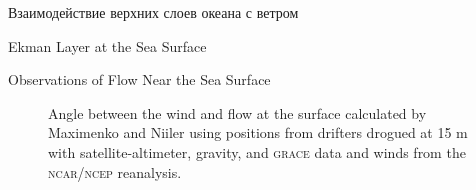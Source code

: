 \begin{chapter}{Взаимодействие верхних слоев океана с ветром}
\begin{section}{Ekman Layer at the Sea Surface}
\begin{paragraph}{Observations of Flow Near the Sea Surface}
\begin{figure}[t!]
\caption{Angle between the wind and flow at the surface calculated by
Maximenko and Niiler using positions from drifters drogued at 15 m
with satellite-altimeter, gravity, and \textsc{grace}
data and winds from the \textsc{ncar/ncep} reanalysis.}
\label{fig:ekmanangle}
\end{figure}
%
\end{paragraph}


\end{section}
\end{chapter}
